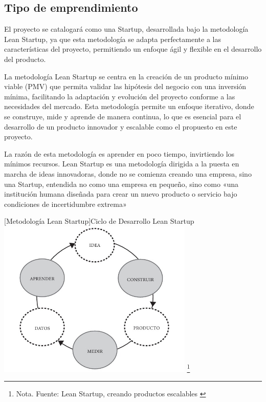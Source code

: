 \subsection*{Tipo de emprendimiento} El proyecto se catalogará como una Startup, desarrollada bajo la metodología Lean Startup, ya que esta metodología se adapta perfectamente a las características del proyecto, permitiendo un enfoque ágil y flexible en el desarrollo del producto.

La metodología Lean Startup se centra en la creación de un producto mínimo viable (PMV) que permita validar las hipótesis del negocio con una inversión mínima, facilitando la adaptación y evolución del proyecto conforme a las necesidades del mercado.
Esta metodología permite un enfoque iterativo, donde se construye, mide y aprende de manera continua, lo que es esencial para el desarrollo de un producto innovador y escalable como el propuesto en este proyecto.

La razón de esta metodología es aprender en poco tiempo, invirtiendo los mínimos recursos. Lean Startup es una metodología dirigida a la puesta en marcha de ideas innovadoras, donde no se comienza creando una empresa, sino una Startup, entendida no como una empresa en pequeño, sino como «una institución humana diseñada para crear un nuevo producto o servicio bajo condiciones de incertidumbre extrema»
\cite{MetodologiaLean}

\begin{minipage}{0.9\textwidth}
        \centering
        [{Metodología Lean Startup}]{Ciclo de Desarrollo Lean Startup}
        \label{leanStartUp}
         \includegraphics[width=0.7\textwidth]{Content/Images/cicloMetodologiaLean.jpeg}
        \footnote{Nota. \textup{Fuente: Lean Startup, creando productos escalables \cite{GioSyst3m}}}
\end{minipage}


